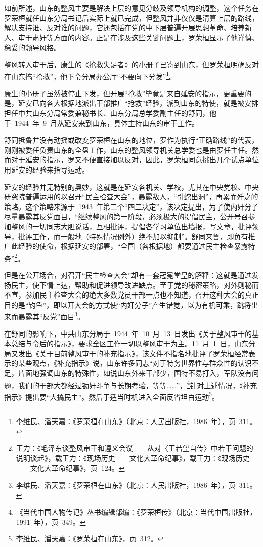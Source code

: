 如前所述，山东的整风主要是解决上层的意见分歧及领导机构的调整，这个任务在罗荣桓就任山东分局书记后实际上就已完成，但整风并非仅仅是清算上层的路线，解决支持谁、反对谁的问题，它还包括在党的中下层普遍开展思想革命、培养新人、审干肃奸等方面的内容。正是在涉及这些关键问题上，罗荣桓显示了他谨慎、稳妥的领导风格。

整风转入审干后，康生的《抢救失足者》的小册子已寄到山东，但罗荣桓明确反对在山东搞“抢救”，他下令分局办公厅“不要向下分发”\footnote{李维民、潘天嘉：《罗荣桓在山东》（北京：人民出版社，1986~年），页~311。}。

康生的小册子虽然被停止下发，但开展“抢救”毕竟是来自延安的指示，更重要的是，延安已向各大根据地派出干部推广“抢救”经验，派到山东的特使，就是被安排担任中共山东分局常委兼秘书长、山东分局总学委副主任的舒同，他于~1944~年~9~月从延安来到山东，具体主持山东的审干工作。

舒同抵鲁并没有动摇或改变罗荣桓在山东的地位，罗作为执行“正确路线”的代表，刚刚被委任负责山东的全盘工作，山东的整风领导机关总学委也是由罗任主任。然而对于延安的指示，罗又不便直接加以反对，因此，罗荣桓同意挑出几个试点单位用延安的经验来指导运动。

延安的经验并无特别的奥妙，这就是在延安各机关、学校，尤其在中央党校、中央研究院普遍运用的以召开“民主检查大会”，暴露敌人，“引蛇出洞”，再累而歼之的策略。这个策略来源于~1943~年第二个“四三决定”，该决定提出，为了使内奸分子尽量暴露其反党面目，“继续整风的第一阶段，必须极大的提倡民主，公开号召参加整风的一切同志大胆说话，互相批评，提倡各学习单位出墙报，写文章，批评领导，批评工作，而一般地（特殊情况例外）绝不加以抑制”。舒同来鲁，即负有推广此经验的使命，根据延安的部署，“全国（各根据地）都要通过民主检查暴露特务”\footnote{王力：《毛泽东谈整风审干和遵义会议——从对〈王若望自传〉中若干问题的说明谈起》，载王力：《现场历史——文化大革命纪事》，载王力：《现场历史——文化大革命纪事》，页~124。}。

但是在公开场合，对召开“民主检查大会”却有一套冠冕堂皇的解释：这就是通过发扬民主，使下情上达，帮助和促进领导改进缺点。至于党的秘密策略，对外则秘而不宣，参加民主检查大会的绝大多数党员干部一点也不知道，召开这种大会的真正目的是“钓鱼”，即以开大会的方式使“内奸分子”产生错觉，以为有机可乘，跳将出来而暴露其“反党”面目\footnote{李维民、潘天嘉：《罗荣桓在山东》（北京：人民出版社，1986~年），页~311。}。

在舒同的影响下，中共山东分局于~1944~年~10~月~13~日发出《关于整风审干的基本总结与令后的指示》，要求全区工作一切以整风审干为主。11~月~1~日，山东分局又发出《关于目前整风审干的补充指示》，该文件不指名地批评了罗荣桓经常表示的某些观点，《补充指示》说，山东许多同志“对于特务世界性与群众性的认识不足，片面地强调山东的特殊性，如说山东外来干部少，国特不易打入，军队没有问题，我们的干部大都经过锄奸斗争与长期考验，等等……”，\footnote{《当代中国人物传记》丛书编辑部编：《罗荣桓传》（北京：当代中国出版社，1991~年），页~349。}针对上述情况，《补充指示》提出要“大搞民主”。然后于适当时机进入全面反省坦白运动\footnote{李维民、潘天嘉：《罗荣桓在山东》，页~312。}。

